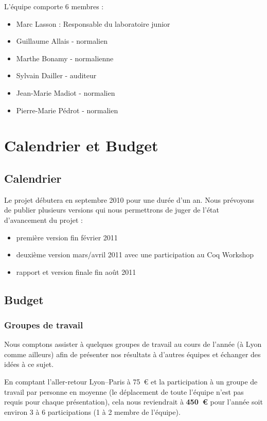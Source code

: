 \documentclass[11pt]{article}
\begin{document}
L'équipe comporte 6 membres :

\begin{itemize}
 \item Marc Lasson : Responsable du laboratoire junior
 \item Guillaume Allais - normalien
 \item Marthe Bonamy - normalienne
 \item Sylvain Dailler - auditeur
 \item Jean-Marie Madiot - normalien
 \item Pierre-Marie Pédrot - normalien
\end{itemize}

\section{Calendrier et Budget}

\subsection{Calendrier}

Le projet débutera en septembre 2010 pour une durée d'un an.
Nous prévoyons de publier plusieurs versions qui nous permettrons de juger de l'état d'avancement du projet : 
\begin{itemize}
 \item première version fin février 2011
 \item deuxième version mars/avril 2011 avec une participation au Coq Workshop
 \item rapport et version finale fin août 2011
\end{itemize}

\subsection{Budget}

\subsubsection{Groupes de travail}

Nous comptons assister à quelques groupes de travail au cours de l'année (à Lyon comme ailleurs) afin de présenter nos résultats à d'autres équipes et échanger des idées à ce sujet. 

En comptant l'aller-retour Lyon--Paris à 75~€ et la participation à un groupe de travail par personne en moyenne (le déplacement de toute l'équipe n'est pas requis pour chaque présentation), cela nous reviendrait à \textbf{450~€} pour l'année soit environ 3 à 6 participations (1 à 2 membre de l'équipe).
\end{document}
